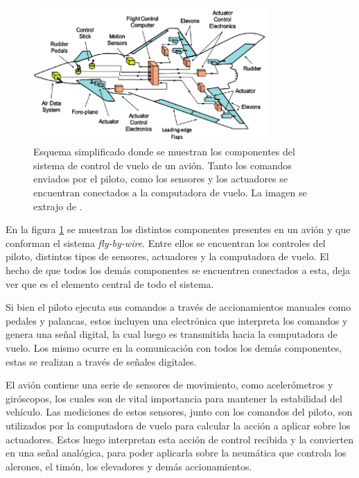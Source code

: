 \begin{figure}[htb]
    \centering
    \includegraphics[width=0.8\textwidth]{img/avion_FBW.png}
    \caption{Esquema simplificado donde se muestran los componentes del sistema de control de vuelo de un avión. Tanto los comandos enviados por el piloto, como los sensores y los actuadores se encuentran conectados a la computadora de vuelo. La imagen se extrajo de \cite{collinson2023introduction}.}
    \label{fig:avion_FBW}
\end{figure}


En la figura \ref{fig:avion_FBW} se muestran los distintos componentes presentes en un avión y que conforman el sistema \textit{fly-by-wire}. Entre ellos se encuentran los controles del piloto, distintos tipos de sensores, actuadores y la computadora de vuelo. El hecho de que todos los demás componentes se encuentren conectados a esta, deja ver que es el elemento central de todo el sistema. 

Si bien el piloto ejecuta sus comandos a través de accionamientos manuales como pedales y palancas, estos incluyen una electrónica que interpreta los comandos y genera una señal digital, la cual luego es transmitida hacia la computadora de vuelo. Los mismo ocurre en la comunicación con todos los demás componentes, estas se realizan a través de señales digitales.

El avión contiene una serie de sensores de movimiento, como acelerómetros y giróscopos, los cuales son de vital importancia para mantener la estabilidad del vehículo. Las mediciones de estos sensores, junto con los comandos del piloto, son utilizados por la computadora de vuelo para calcular la acción a aplicar sobre los actuadores. Estos luego interpretan esta acción de control recibida y la convierten en una señal analógica, para poder aplicarla sobre la neumática que controla los alerones, el timón, los elevadores y demás accionamientos. %

